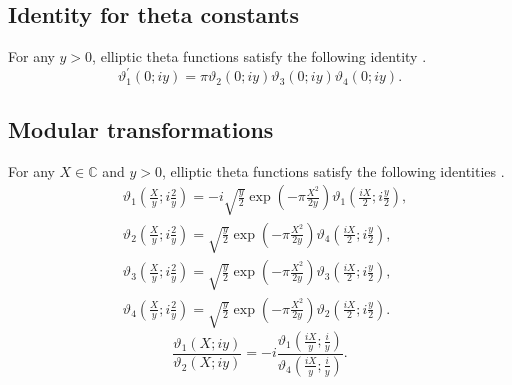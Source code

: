 \documentclass[10pt,leqno]{amsart}
\numberwithin{equation}{section}
\begin{document}
\subsection{Identity for theta constants}
For any $y>0$, elliptic theta functions satisfy the following identity \cite{Mumford:Tata_I,Khachev_Zabrodin:theta}.
\begin{equation}\label{id:const}
\vartheta_1^{'} \left( 0; iy \right)= \pi \vartheta_2 \left( 0; iy \right) \vartheta_3 \left( 0; iy \right) \vartheta_4 \left( 0; iy \right).
\end{equation}
\subsection{Modular transformations}
For any $X\in\mathbb{C}$ and $y>0$, elliptic theta functions satisfy the following identities \cite{Mumford:Tata_I,Khachev_Zabrodin:theta}.
 \begin{equation}\label{id:modular}
 \begin{split}
 &\vartheta_{1}\left(\frac{X}{y}; i\frac{2}{y}\right)=-i\sqrt{\frac{y}{2}}\exp\left(-\pi\frac{X^{2}}{2y}\right)\vartheta_{1}\left(\frac{iX}{2}; i\frac{y}{2}\right),\\
 & \vartheta_{2}\left(\frac{X}{y}; i\frac{2}{y}\right)=\sqrt{\frac{y}{2}}\exp\left(-\pi\frac{X^{2}}{2y}\right)\vartheta_{4}\left(\frac{iX}{2}; i\frac{y}{2}\right),\\
  &\vartheta_{3}\left(\frac{X}{y}; i\frac{2}{y}\right)=\sqrt{\frac{y}{2}}\exp\left(-\pi\frac{X^{2}}{2y}\right)\vartheta_{3}\left(\frac{iX}{2}; i\frac{y}{2}\right),\\
 &\vartheta_{4}\left(\frac{X}{y}; i\frac{2}{y}\right)=\sqrt{\frac{y}{2}}\exp\left(-\pi\frac{X^{2}}{2y}\right)\vartheta_{2}\left(\frac{iX}{2}; i\frac{y}{2}\right).
 \end{split}
 \end{equation}
 \begin{equation}
\frac{\vartheta_{1}\left(X; iy\right)}{\vartheta_{2}\left(X; iy\right)}=-i\frac{\vartheta_{1}\left(\frac{iX}{y}; \frac{i}{y}\right)}{\vartheta_{4}\left(\frac{iX}{y}; \frac{i}{y}\right)}.\label{kappa-4}
\end{equation}
\end{document}
